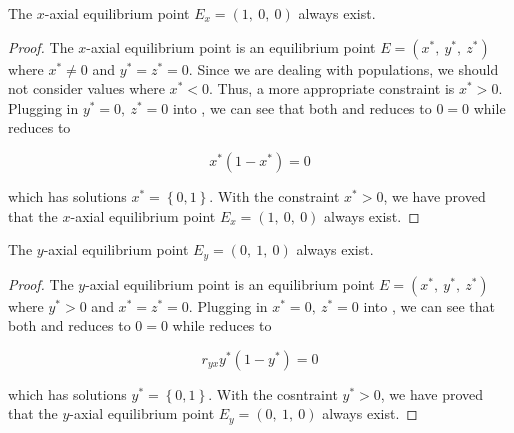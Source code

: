 \begin{theorem}\label{thm:eq-axial-x-exist}
    The $x$-axial equilibrium point $E_x=\left(1,\ 0,\ 0\right)$ always exist.
\end{theorem}
\begin{proof}
    The $x$-axial equilibrium point is an equilibrium point $E=\left(x^*,\ y^*,\ z^*\right)$ where $x^*\neq0$ and $y^*=z^*=0$. Since we are dealing with populations, we should not consider values where $x^*<0$. Thus, a more appropriate constraint is $x^*>0$. Plugging in $y^*=0,\ z^*=0$ into , we can see that both  and  reduces to $0=0$ while  reduces to

    \begin{equation*}
        x^*\left(1-x^*\right)=0
    \end{equation*}

    which has solutions $x^*=\left\{0,1\right\}$. With the constraint $x^*>0$, we have proved that the $x$-axial equilibrium point $E_x=\left(1,\ 0,\ 0\right)$ always exist.
\end{proof}

\begin{theorem}\label{thm:eq-axial-y-exist}
    The $y$-axial equilibrium point $E_y=\left(0,\ 1,\ 0\right)$ always exist.
\end{theorem}
\begin{proof}
    The $y$-axial equilibrium point is an equilibrium point $E=\left(x^*,\ y^*,\ z^*\right)$ where $y^*>0$ and $x^*=z^*=0$. Plugging in $x^*=0,\ z^*=0$ into , we can see that both  and  reduces to $0=0$ while  reduces to

    \begin{equation*}
        r_{yx}y^*\left(1-y^*\right)=0
    \end{equation*}

    which has solutions $y^*=\left\{0,1\right\}$. With the cosntraint $y^*>0$, we have proved that the $y$-axial equilibrium point $E_y=\left(0,\ 1,\ 0\right)$ always exist.
\end{proof}

